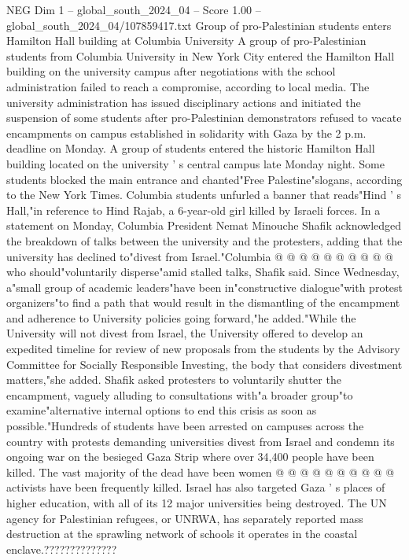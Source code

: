 \begin{textsample}{NEG Dim 1 – global\_south\_2024\_04 – Score 1.00 – global\_south\_2024\_04/107859417.txt}  \label{ex:f1_neg_414}
Group of pro-Palestinian students enters Hamilton Hall building at Columbia University A group of pro-Palestinian students from Columbia University in New York City entered the Hamilton Hall building on the university campus after negotiations with the school administration failed to reach a compromise, according to local media.
The university administration has issued disciplinary actions and initiated the suspension of some students after pro-Palestinian demonstrators refused to vacate encampments on campus established in solidarity with Gaza by the 2 p.m. deadline on Monday.
A group of students entered the historic Hamilton Hall building located on the university ' s central campus late Monday night.
Some students blocked the main entrance and chanted"Free Palestine"slogans, according to the New York Times.
Columbia students unfurled a banner that reads"Hind ' s Hall,"in reference to Hind Rajab, a 6-year-old girl killed by Israeli forces.
In a statement on Monday, Columbia President Nemat Minouche Shafik acknowledged the breakdown of talks between the university and the protesters, adding that the university has declined to"divest from Israel."Columbia @ @ @ @ @ @ @ @ @ @ who should"voluntarily disperse"amid stalled talks, Shafik said.
Since Wednesday, a"small group of academic leaders"have been in"constructive dialogue"with protest organizers"to find a path that would result in the dismantling of the encampment and adherence to University policies going forward,"he added."While the University will not divest from Israel, the University offered to develop an expedited timeline for review of new proposals from the students by the Advisory Committee for Socially Responsible Investing, the body that considers divestment matters,"she added.
Shafik asked protesters to voluntarily shutter the encampment, vaguely alluding to consultations with"a broader group"to examine"alternative internal options to end this crisis as soon as possible."Hundreds of students have been arrested on campuses across the country with protests demanding universities divest from Israel and condemn its ongoing war on the besieged Gaza Strip where over 34,400 people have been killed.
The vast majority of the dead have been women @ @ @ @ @ @ @ @ @ @ activists have been frequently killed.
Israel has also targeted Gaza ' s places of higher education, with all of its 12 major universities being destroyed.
The UN agency for Palestinian refugees, or UNRWA, has separately reported mass destruction at the sprawling network of schools it operates in the coastal enclave.??????????????

\end{textsample}
